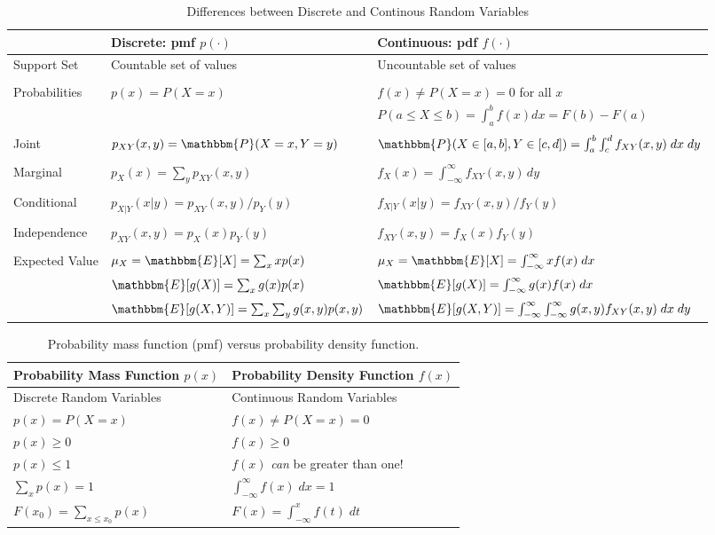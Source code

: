 \documentclass[12pt]{article}
\begin{document}
\begin{table}
\onehalfspacing
\centering
	\begin{tabular}{l|ll}
	\hline
  & Discrete: pmf $p(\cdot)$ & Continuous: pdf $f(\cdot)$ \\
	\hline
	Support Set & Countable set of values & Uncountable set of values\\\\
  Probabilities & $p(x) = P(X=x)$ &$f(x) \neq P(X=x)= 0$ for all $x$\\
	&&$P(a\leq X \leq b) = \int_{a}^{b} f(x)dx=F(b) - F(a)$\\\\
  Joint & $p_{XY}(x,y) = \mathbbm{P}(X=x,Y=y)$& $\mathbbm{P}(X\in [a,b],  Y\in [c,d]) = \int_{a}^b \int_{c}^d f_{XY}(x,y)\; dx \; dy$\\ \\
  Marginal & $p_X(x) = \sum_{y} p_{XY}(x,y)$ & $f_X(x) = \int_{-\infty}^{\infty} f_{XY}(x,y) \, dy$\\ \\
  Conditional  & $p_{X|Y}(x|y) = p_{XY}(x,y)/p_Y(y) $ & $f_{X|Y}(x|y) = f_{XY}(x,y)/f_Y(y)$ \\ \\
	 Independence & $p_{XY}(x,y) = p_X(x)p_Y(y)$ & $f_{XY}(x,y) = f_X(x) f_Y(y)$\\\\
	Expected Value & $\mu_X=\mathbbm{E}[X] =\sum_x xp(x)$ &$\mu_X=\mathbbm{E}[X] =\int_{-\infty}^{\infty} xf(x)\; dx$\\
	& $\mathbbm{E}[g(X)] =\sum_x g(x)p(x)$ &$\mathbbm{E}[g(X)] =\int_{-\infty}^{\infty} g(x)f(x)\; dx$\\
  & $\mathbbm{E}[g(X,Y)] =\sum_x \sum_y g(x,y)p(x,y)$ &$\mathbbm{E}[g(X,Y)] =\int_{-\infty}^{\infty}\int_{-\infty}^{\infty} g(x,y)f_{XY}(x,y)\; dx \; dy$\\
	\hline
	\end{tabular}
	\caption{Differences between Discrete and Continous Random Variables}
	
\end{table}




\begin{table}
\onehalfspacing
\centering
\begin{tabular}{l|l}
\hline
Probability Mass Function $p(x)$& Probability Density Function $f(x)$\\
	\hline
	Discrete Random Variables & Continuous Random Variables\\
	$p(x) = P(X=x)$& $f(x) \neq P(X=x)=0$\\
	$p(x)\geq 0$ & $f(x)\geq 0$\\
	$p(x) \leq 1$ & $f(x)$ \emph{can} be greater than one!\\
	$\sum_{x}p(x) = 1$&$\int_{-\infty}^{\infty}f(x)\; dx = 1$\\
	$F(x_0)= \sum_{x\leq x_0} p(x)$& $F(x) = \int_{-\infty}^{x} f(t)\; dt$\\
	\hline
\end{tabular}
\caption{Probability mass function (pmf) versus probability density function.}
\end{table}
\end{document}
